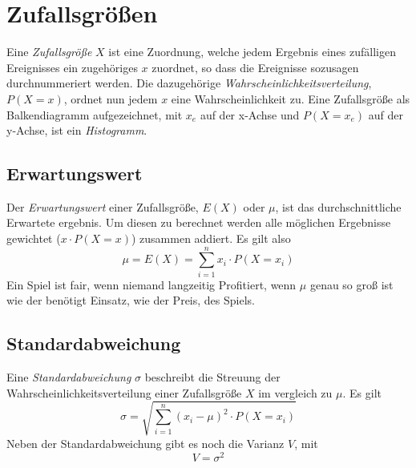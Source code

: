 \documentclass{article}
\begin{document}
\section{Zufallsgrößen} 
Eine \emph{Zufallsgröße} $X$ ist eine Zuordnung, welche jedem Ergebnis eines zufälligen Ereignisses ein zugehöriges $x$ zuordnet, so dass die Ereignisse sozusagen durchnummeriert werden. Die dazugehörige \emph{Wahrscheinlichkeitsverteilung}, $P(X=x)$, ordnet nun jedem $x$ eine Wahrscheinlichkeit zu. \newline
Eine Zufallsgröße als Balkendiagramm aufgezeichnet, mit $x_e$ auf der x-Achse und $P(X=x_e)$ auf der y-Achse, ist ein \emph{Histogramm}.
 
\subsection{Erwartungswert}
Der \emph{Erwartungswert} einer Zufallsgröße, $E(X)$ oder $\mu$, ist das durchschnittliche Erwartete ergebnis. Um diesen zu berechnet werden alle möglichen Ergebnisse gewichtet ($x \cdot P(X=x)$) zusammen addiert. Es gilt also
\[
 \mu = E(X) = \sum_{i=1}^n x_i \cdot P(X=x_i) 
\]  
Ein Spiel ist fair, wenn niemand langzeitig Profitiert, wenn $\mu$ genau so groß ist wie der benötigt Einsatz, wie der Preis, des Spiels.
 
\subsection{Standardabweichung}
Eine \emph{Standardabweichung} $\sigma$ beschreibt die Streuung der Wahrscheinlichkeitsverteilung einer Zufallsgröße $X$ im vergleich zu $\mu$. Es gilt
\[
 \sigma = \sqrt{\sum_{i=1}^n (x_i - \mu)^2 \cdot P(X=x_i)}
\]
Neben der Standardabweichung gibt es noch die Varianz $V$, mit
\[ 
 V = \sigma^2 
\] 
\end{document}
